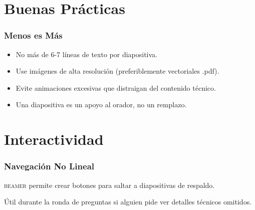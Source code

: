 \documentclass[12pt,aspectratio=169,ignorenonframetext]{ltxbeamer}
\newcommand{\beamer}{\textsc{beamer}}
\begin{document}
\section{Buenas Prácticas}

\begin{frame}
\frametitle{Menos es Más}
\begin{itemize}
    \item No más de 6-7 líneas de texto por diapositiva.
    \item Use imágenes de alta resolución (preferiblemente vectoriales .pdf).
    \item Evite animaciones excesivas que distraigan del contenido técnico.
    \pause
    \item Una diapositiva es un apoyo al orador, no un remplazo.
\end{itemize}
\end{frame}



\section{Interactividad}

\begin{frame}[label=backup0_return]
    \frametitle{Navegación No Lineal}
    {\lmr\beamer} permite crear botones para saltar a diapositivas de respaldo.

    \vfill
    \centering
    \hyperlink{backup0}{}
    \vfill

    Útil durante la ronda de preguntas si alguien pide ver detalles técnicos omitidos.
\end{frame}





\end{document}
